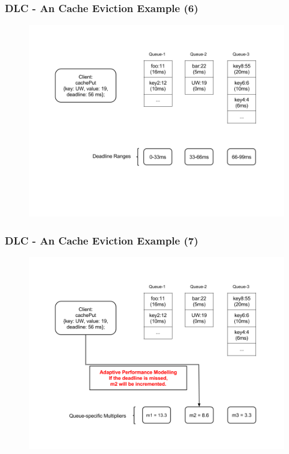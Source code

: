 \documentclass{beamer}
\begin{document}
\begin{frame}
  \frametitle{DLC - An Cache Eviction Example (6)}
  \begin{figure}
    \begin{center}
      \centerline{\includegraphics[scale=0.33]{img/DLC_NEW_6.png}}
    \end{center}
  \end{figure}
\end{frame}


\begin{frame}
  \frametitle{DLC - An Cache Eviction Example (7)}
  \begin{figure}
    \begin{center}
      \centerline{\includegraphics[scale=0.33]{img/DLC_NEW_7.png}}
    \end{center}
  \end{figure}
\end{frame}
\end{document}
